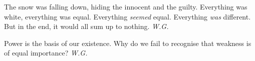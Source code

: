 The snow was falling down, 
hiding the innocent 
and the guilty. 
Everything was white, 
everything was equal. 
Everything \emph{seemed} equal. 
Everything \emph{was} different. 
But in the end, it would all sum up 
to nothing. 
\emph{W.G.}

Power 
is the basis of our existence. 
Why do we fail to recognise 
that weakness is of equal importance? 
\emph{W.G.}

